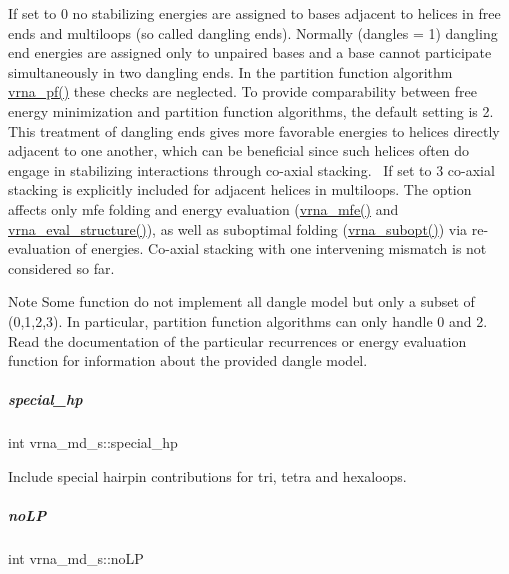 If set to 0 no stabilizing energies are assigned to bases adjacent to helices in free ends and multiloops (so called dangling ends). Normally (dangles = 1) dangling end energies are assigned only to unpaired bases and a base cannot participate simultaneously in two dangling ends. In the partition function algorithm \mbox{\hyperlink{group__pf__fold_ga29e256d688ad221b78d37f427e0e99bc}{vrna\+\_\+pf()}} these checks are neglected. To provide comparability between free energy minimization and partition function algorithms, the default setting is 2. This treatment of dangling ends gives more favorable energies to helices directly adjacent to one another, which can be beneficial since such helices often do engage in stabilizing interactions through co-\/axial stacking.~\newline
If set to 3 co-\/axial stacking is explicitly included for adjacent helices in multiloops. The option affects only mfe folding and energy evaluation (\mbox{\hyperlink{group__mfe__fold_gabd3b147371ccf25c577f88bbbaf159fd}{vrna\+\_\+mfe()}} and \mbox{\hyperlink{group__eval_ga58f199f1438d794a265f3b27fc8ea631}{vrna\+\_\+eval\+\_\+structure()}}), as well as suboptimal folding (\mbox{\hyperlink{group__subopt__wuchty_ga0f11d738fb8c8b1885a90c11c8931ff6}{vrna\+\_\+subopt()}}) via re-\/evaluation of energies. Co-\/axial stacking with one intervening mismatch is not considered so far. \begin{DoxyNote}{Note}
Some function do not implement all dangle model but only a subset of (0,1,2,3). In particular, partition function algorithms can only handle 0 and 2. Read the documentation of the particular recurrences or energy evaluation function for information about the provided dangle model. 
\end{DoxyNote}
\mbox{\label{group__model__details_add64a96d23e77ef1d0ddf8dfc5228143}} 
\subparagraph{\texorpdfstring{special\+\_\+hp}{special\_hp}}
{\footnotesize\ttfamily int vrna\+\_\+md\+\_\+s\+::special\+\_\+hp}



Include special hairpin contributions for tri, tetra and hexaloops. 

\mbox{\label{group__model__details_a753200bf21cee0ea2df64afe43999f5d}} 
\subparagraph{\texorpdfstring{no\+LP}{noLP}}
{\footnotesize\ttfamily int vrna\+\_\+md\+\_\+s\+::no\+LP}



